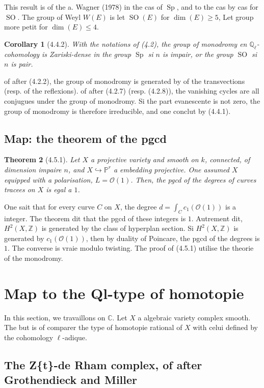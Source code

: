 \documentclass[12pt,a4paper]{article}
\theoremstyle{plain}
\newtheorem{theorem}{Theorem}[section]
\newtheorem{corollary}[theorem]{Corollary}
\theoremstyle{definition}
\theoremstyle{remark}
\DeclareMathOperator{\Sp}{Sp}
\DeclareMathOperator{\SO}{SO}
\newcommand{\bbZ}{\mathbb{Z}}
\newcommand{\bbC}{\mathbb{C}}
\newcommand{\bbP}{\mathbb{P}}
\newcommand{\scrO}{\mathscr{O}}
\newcommand{\Ql}{\mathbb{Q}_\ell}
\begin{document}
This result is of the a. Wagner (1978) in the cas of $\Sp$, and to the cas by cas for $\SO$. The group of Weyl $W(E)$ is let $\SO(E)$ for $\dim(E) \geq 5$, Let group more petit for $\dim(E) \leq 4$.

\begin{corollary}[4.4.2]
With the notations of (4.2), the group of monodromy en $\Ql$-cohomology is Zariski-dense in the group $\Sp$ si $n$ is impair, or the group $\SO$ si $n$ is pair.
\end{corollary}

of after (4.2.2), the group of monodromy is generated by of the transvections (resp. of the reflexions). of after (4.2.7) (resp. (4.2.8)), the vanishing cycles are all conjugues under the group of monodromy. Si the part evanescente is not zero, the group of monodromy is therefore irreducible, and one conclut by (4.4.1).

\subsection{Map: the theorem of the pgcd}

\begin{theorem}[4.5.1]
Let $X$ a projective variety and smooth on $k$, connected, of dimension impaire $n$, and $X \hookrightarrow \bbP^r$ a embedding projective. One assumed $X$ equipped with a polarisation, $L = \scrO(1)$. Then, the pgcd of the degrees of curves tracees on $X$ is egal a $1$.
\end{theorem}

One sait that for every curve $C$ on $X$, the degree $d = \int_C c_1(\scrO(1))$ is a integer. The theorem dit that the pgcd of these integers is $1$. Autrement dit, $H^2(X, \bbZ)$ is generated by the class of hyperplan section. Si $H^2(X, \bbZ)$ is generated by $c_1(\scrO(1))$, then by duality of Poincare, the pgcd of the degrees is $1$. The converse is vraie modulo twisting. The proof of (4.5.1) utilise the theorie of the monodromy.


\section{Map to the Ql-type of homotopie}

In this section, we travaillons on $\bbC$. Let $X$ a algebraic variety complex smooth. The but is of comparer the type of homotopie rational of $X$ with celui defined by the cohomology $\ell$-adique.

\subsection{The Z\{t\}-de Rham complex, of after Grothendieck and Miller}
\end{document}
